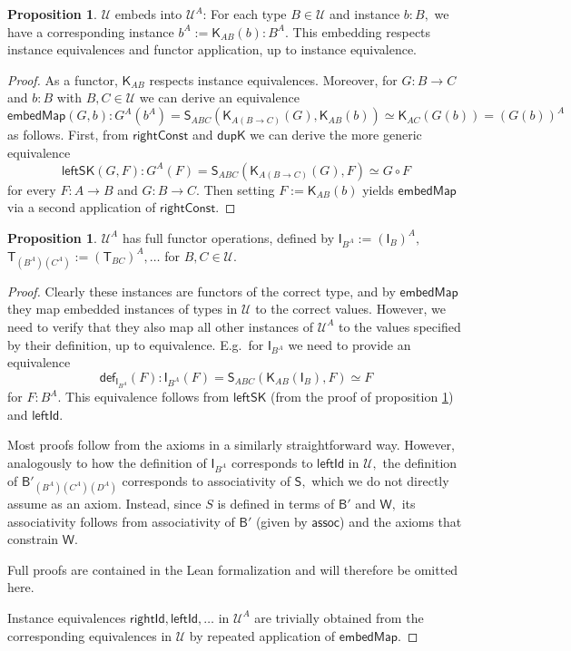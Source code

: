 \documentclass[a4paper]{article}
\theoremstyle{definition}
\newtheorem{proposition}[definition]{Proposition}
\theoremstyle{remark}
\renewcommand{\equiv}{\simeq}
\newcommand{\U}{\mathcal{U}}
\newcommand{\nm}{\mathsf}
\newcommand{\fndef}[1]{\nm{def}_{#1}}
\newcommand{\combinator}{\nm}
\newcommand{\idFun}{\combinator{I}}
\newcommand{\appFun}{\combinator{T}}
\newcommand{\constFun}{\combinator{K}}
\newcommand{\compFun}{\combinator{B'}}
\newcommand{\dupFun}{\combinator{W}}
\newcommand{\revSubstFun}{\combinator{S}}
\begin{document}
\begin{proposition}
  \label{prp:fun-univ-embed-map}
  $\U$ embeds into $\U^A$: For each type $B \in \U$ and instance $b : B,$ we have
  a corresponding instance $b^A := \constFun_{AB}(b) : B^A.$ This embedding
  respects instance equivalences and functor application, up to instance equivalence.
\end{proposition}
\vspace{-1ex}
\begin{proof}
  As a functor, $\constFun_{AB}$ respects instance equivalences.
  Moreover, for $G : B \to C$ and $b : B$ with $B,C \in \U$ we can derive an equivalence
  \[\nm{embedMap}(G,b) : G^A(b^A) = \revSubstFun_{ABC}(\constFun_{A(B{\to}C)}(G),\constFun_{AB}(b)) \equiv
    \constFun_{AC}(G(b)) = (G(b))^A\]
  as follows.
  First, from $\nm{rightConst}$ and $\nm{dupK}$ we can derive the more generic equivalence
  \[\nm{leftSK}(G,F) : G^A(F) = \revSubstFun_{ABC}(\constFun_{A(B{\to}C)}(G),F) \equiv G \circ F\]
  for every $F : A \to B$ and $G : B \to C.$
  Then setting $F := \constFun_{AB}(b)$ yields $\nm{embedMap}$ via a second application
  of $\nm{rightConst}.$
\end{proof}

\begin{proposition}
  \label{prp:fun-univ-full-funop}
  $\U^A$ has full functor operations, defined by $\idFun_{B^A} := (\idFun_B)^A,$
  $\appFun_{(B^A)(C^A)} := (\appFun_{BC})^A, \ldots$ for $B,C \in \U.$
\end{proposition}
\vspace{-1ex}
\begin{proof}
  Clearly these instances are functors of the correct type, and by $\nm{embedMap}$
  they map embedded instances of types in $\U$ to the correct values. However, we
  need to verify that they also map all other instances of $\U^A$ to the values
  specified by their definition, up to equivalence. E.g.\ for $\idFun_{B^A}$ we
  need to provide an equivalence
  \[\fndef{\idFun_{B^A}}(F) : \idFun_{B^A}(F) = \revSubstFun_{ABC}(\constFun_{AB}(\idFun_B),F) \equiv F\]
  for $F : B^A.$ This equivalence follows from $\nm{leftSK}$ (from the proof of
  proposition \ref{prp:fun-univ-embed-map}) and $\nm{leftId}.$

  Most proofs follow from the axioms in a similarly straightforward way. However,
  analogously to how the definition of $\idFun_{B^A}$ corresponds to $\nm{leftId}$
  in $\U,$ the definition of $\compFun_{(B^A)(C^A)(D^A)}$ corresponds to
  associativity of $\revSubstFun,$ which we do not directly assume as an axiom.
  Instead, since $S$ is defined in terms of $\compFun$ and $\dupFun,$ its
  associativity follows from associativity of $\compFun$ (given by $\nm{assoc}$)
  and the axioms that constrain $\dupFun.$

  Full proofs are contained in the Lean formalization and will therefore be
  omitted here.

  Instance equivalences $\nm{rightId}, \nm{leftId}, \ldots$ in $\U^A$ are trivially
  obtained from the corresponding equivalences in $\U$ by repeated application of
  $\nm{embedMap}.$
\end{proof}
\end{document}
